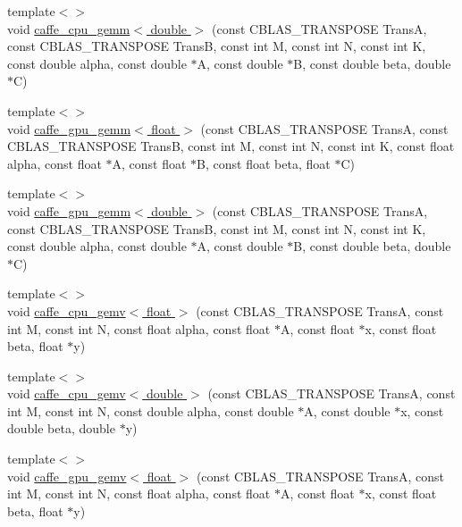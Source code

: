 \begin{DoxyCompactItemize}
\item 
{\footnotesize template$<$$>$ }\\void \hyperlink{namespacecaffe_aa83e160e90266206ce3baf458a21d884}{caffe\+\_\+cpu\+\_\+gemm$<$ double $>$} (const C\+B\+L\+A\+S\+\_\+\+T\+R\+A\+N\+S\+P\+O\+S\+E Trans\+A, const C\+B\+L\+A\+S\+\_\+\+T\+R\+A\+N\+S\+P\+O\+S\+E Trans\+B, const int M, const int N, const int K, const double alpha, const double $\ast$A, const double $\ast$B, const double beta, double $\ast$C)
\item 
{\footnotesize template$<$$>$ }\\void \hyperlink{namespacecaffe_a5f0e4991b28c426f02ca2e29b2f0b54e}{caffe\+\_\+gpu\+\_\+gemm$<$ float $>$} (const C\+B\+L\+A\+S\+\_\+\+T\+R\+A\+N\+S\+P\+O\+S\+E Trans\+A, const C\+B\+L\+A\+S\+\_\+\+T\+R\+A\+N\+S\+P\+O\+S\+E Trans\+B, const int M, const int N, const int K, const float alpha, const float $\ast$A, const float $\ast$B, const float beta, float $\ast$C)
\item 
{\footnotesize template$<$$>$ }\\void \hyperlink{namespacecaffe_a6f062fbe7ec126aa61ee1eb25f8ff1c3}{caffe\+\_\+gpu\+\_\+gemm$<$ double $>$} (const C\+B\+L\+A\+S\+\_\+\+T\+R\+A\+N\+S\+P\+O\+S\+E Trans\+A, const C\+B\+L\+A\+S\+\_\+\+T\+R\+A\+N\+S\+P\+O\+S\+E Trans\+B, const int M, const int N, const int K, const double alpha, const double $\ast$A, const double $\ast$B, const double beta, double $\ast$C)
\item 
{\footnotesize template$<$$>$ }\\void \hyperlink{namespacecaffe_ab5a4363a871d7f6efa2d0fb201ca986a}{caffe\+\_\+cpu\+\_\+gemv$<$ float $>$} (const C\+B\+L\+A\+S\+\_\+\+T\+R\+A\+N\+S\+P\+O\+S\+E Trans\+A, const int M, const int N, const float alpha, const float $\ast$A, const float $\ast$x, const float beta, float $\ast$y)
\item 
{\footnotesize template$<$$>$ }\\void \hyperlink{namespacecaffe_afd43f6e27055e68628f6eb42f8416407}{caffe\+\_\+cpu\+\_\+gemv$<$ double $>$} (const C\+B\+L\+A\+S\+\_\+\+T\+R\+A\+N\+S\+P\+O\+S\+E Trans\+A, const int M, const int N, const double alpha, const double $\ast$A, const double $\ast$x, const double beta, double $\ast$y)
\item 
{\footnotesize template$<$$>$ }\\void \hyperlink{namespacecaffe_aff6b1bce641fa117fc85e15363c26aab}{caffe\+\_\+gpu\+\_\+gemv$<$ float $>$} (const C\+B\+L\+A\+S\+\_\+\+T\+R\+A\+N\+S\+P\+O\+S\+E Trans\+A, const int M, const int N, const float alpha, const float $\ast$A, const float $\ast$x, const float beta, float $\ast$y)

\end{DoxyCompactItemize}
